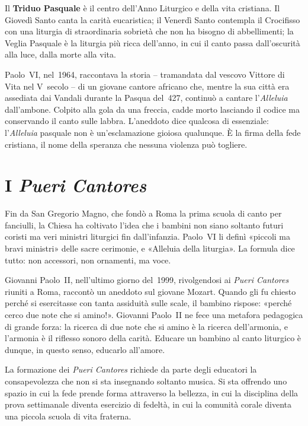\documentclass[12pt,a4paper]{article}
\begin{document}
	Il \textbf{Triduo Pasquale} è il centro dell'Anno Liturgico e della vita
	cristiana. Il Giovedì Santo canta la carità eucaristica; il Venerdì Santo
	contempla il Crocifisso con una liturgia di straordinaria sobrietà che non ha
	bisogno di abbellimenti; la Veglia Pasquale è la liturgia più ricca dell'anno,
	in cui il canto passa dall'oscurità alla luce, dalla morte alla vita.
	
	Paolo~VI, nel~1964, raccontava la storia -- tramandata dal vescovo Vittore di
	Vita nel V~secolo -- di un giovane cantore africano che, mentre la sua città era
	assediata dai Vandali durante la Pasqua del~427, continuò a cantare
	l'\emph{Alleluia} dall'ambone. Colpito alla gola da una freccia, cadde morto
	lasciando il codice ma conservando il canto sulle labbra. L'aneddoto dice
	qualcosa di essenziale: l'\emph{Alleluia} pasquale non è un'esclamazione gioiosa
	qualunque. È la firma della fede cristiana, il nome della speranza che nessuna
	violenza può togliere.
	
	\section{I \emph{Pueri Cantores}}
	
	Fin da San Gregorio Magno, che fondò a Roma la prima scuola di canto per
	fanciulli, la Chiesa ha coltivato l'idea che i bambini non siano soltanto futuri
	coristi ma veri ministri liturgici fin dall'infanzia. Paolo~VI li definì
	«piccoli ma bravi ministri» delle sacre cerimonie, e «Alleluia della liturgia».
	La formula dice tutto: non accessori, non ornamenti, ma voce.
	
	Giovanni Paolo~II, nell'ultimo giorno del~1999, rivolgendosi ai \emph{Pueri
		Cantores} riuniti a Roma, raccontò un aneddoto sul giovane Mozart. Quando gli fu
	chiesto perché si esercitasse con tanta assiduità sulle scale, il bambino
	rispose: «perché cerco due note che si amino!». Giovanni Paolo~II ne fece una
	metafora pedagogica di grande forza: la ricerca di due note che si amino è la
	ricerca dell'armonia, e l'armonia è il riflesso sonoro della carità. Educare un
	bambino al canto liturgico è dunque, in questo senso, educarlo all'amore.
	
	La formazione dei \emph{Pueri Cantores} richiede da parte degli educatori la
	consapevolezza che non si sta insegnando soltanto musica. Si sta offrendo uno
	spazio in cui la fede prende forma attraverso la bellezza, in cui la disciplina
	della prova settimanale diventa esercizio di fedeltà, in cui la comunità corale
	diventa una piccola scuola di vita fraterna.
	
\end{document}
